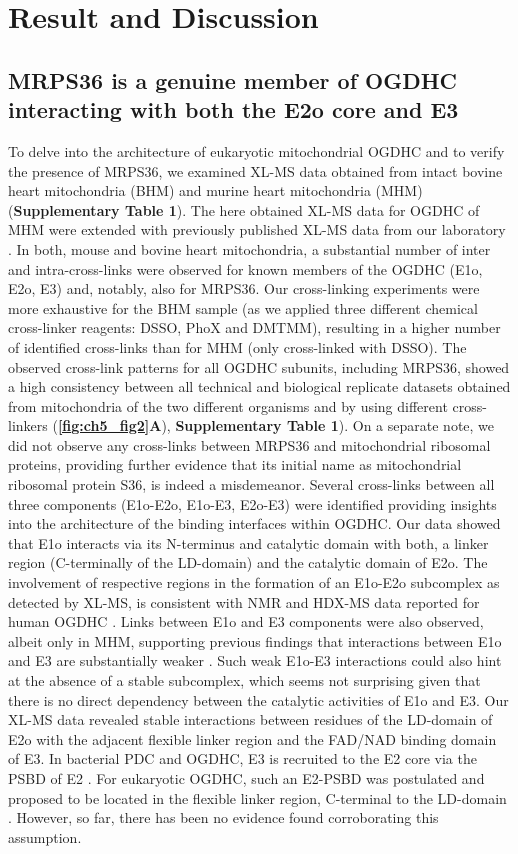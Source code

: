 \section{Result and Discussion}
\subsection*{MRPS36 is a genuine member of OGDHC interacting with both the E2o core and E3}
To delve into the architecture of eukaryotic mitochondrial OGDHC and to verify the presence of MRPS36, we examined XL-MS data obtained from intact bovine heart mitochondria (BHM) \cite{Hevler_2021b} and murine heart mitochondria (MHM) (\textbf{Supplementary Table 1}). The here obtained XL-MS data for OGDHC of MHM were extended with previously published XL-MS data from our laboratory \cite{Liu_2018}. In both, mouse and bovine heart mitochondria, a substantial number of inter and intra-cross-links were observed for known members of the OGDHC (E1o, E2o, E3) and, notably, also for MRPS36. Our cross-linking experiments were more exhaustive for the BHM sample (as we applied three different chemical cross-linker reagents: DSSO, PhoX and DMTMM), resulting in a higher number of identified cross-links than for MHM (only cross-linked with DSSO). The observed cross-link patterns for all OGDHC subunits, including MRPS36, showed a high consistency between all technical and biological replicate datasets obtained from mitochondria of the two different organisms and by using different cross-linkers (\textbf{\autoref{fig:ch5_fig2}A}), \textbf{Supplementary Table 1}). On a separate note, we did not observe any cross-links between MRPS36 and mitochondrial ribosomal proteins, providing further evidence that its initial name as mitochondrial ribosomal protein S36, is indeed a misdemeanor. Several cross-links between all three components (E1o-E2o, E1o-E3, E2o-E3) were identified providing insights into the architecture of the binding interfaces within OGDHC. Our data showed that E1o interacts via its N-terminus and catalytic domain with both, a linker region (C-terminally of the LD-domain) and the catalytic domain of E2o. The involvement of respective regions in the formation of an E1o-E2o subcomplex as detected by XL-MS, is consistent with NMR and HDX-MS data reported for human OGDHC \cite{Zhou_2018}. Links between E1o and E3 components were also observed, albeit only in MHM, supporting previous findings that interactions between E1o and E3 are substantially weaker \cite{Zhou_2018}. Such weak E1o-E3 interactions could also hint at the absence of a stable subcomplex, which seems not surprising given that there is no direct dependency between the catalytic activities of E1o and E3. Our XL-MS data revealed stable interactions between residues of the LD-domain of E2o with the adjacent flexible linker region and the FAD/NAD binding domain of E3. In bacterial PDC and OGDHC, E3 is recruited to the E2 core via the PSBD of E2 \cite{Frank_2005, Fries_2007, Mande_1996, Perham_2000, Robien_1992}. For eukaryotic OGDHC, such an E2-PSBD was postulated and proposed to be located in the flexible linker region, C-terminal to the LD-domain \cite{Liu_2022}. However, so far, there has been no evidence found corroborating this assumption.

